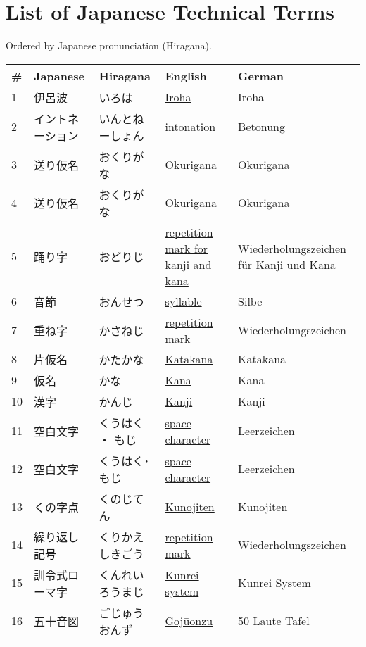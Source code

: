 \chapter{List of Japanese Technical Terms}
\label{chap:ListOfJapaneseTechnicalTerms}
\label{sec:JapaneseTechnicalTerms}
\normalsize Ordered by Japanese pronunciation (Hiragana).
\footnotesize\Padding
\begin{longtable}[c]{p{.5cm}p{3.5cm}p{4cm}p{3.5cm}p{3.5cm}}
\textbf{\#}&\textbf{Japanese}&\textbf{Hiragana}&\textbf{English}&\textbf{German}\\ \hline
1&伊呂波&いろは&\hyperref[sec:Iroha]{Iroha}&Iroha\\
2&イントネーション&いんとねーしょん&\hyperref[sec:Intonation]{intonation}&Betonung\\
3&送り仮名&おくりがな&\hyperref[sec:Okurigana]{Okurigana}&Okurigana\\
4&送り仮名&おくりがな&\hyperref[sec:Okurigana]{Okurigana}&Okurigana\\
5&踊り字&おどりじ&\hyperref[sec:RepitionMarkForKanjiAndKana]{repetition mark for kanji and kana}&Wiederholungszeichen für Kanji und Kana\\
6&音節&おんせつ&\hyperref[sec:Syllable]{syllable}&Silbe\\
7&重ね字&かさねじ&\hyperref[sec:RepitionMark]{repetition mark}&Wiederholungszeichen\\
8&片仮名&かたかな&\hyperref[sec:Katakana]{Katakana}&Katakana\\
9&仮名&かな&\hyperref[sec:Kana]{Kana}&Kana\\
10&漢字&かんじ&\hyperref[sec:Kanji]{Kanji}&Kanji\\
11&空白文字&くうはく ・ もじ&\hyperref[sec:SpaceCharacter]{space character}&Leerzeichen\\
12&空白文字&くうはく･もじ&\hyperref[sec:SpaceCharacter]{space character}&Leerzeichen\\
13&くの字点&くのじてん&\hyperref[sec:Kunojiten]{Kunojiten}&Kunojiten\\
14&繰り返し記号&くりかえしきごう&\hyperref[sec:RepitionMark]{repetition mark}&Wiederholungszeichen\\
15&訓令式ローマ字&くんれいろうまじ&\hyperref[sec:KunreiSystem]{Kunrei system}&Kunrei System\\
16&五十音図&ごじゅうおんず&\hyperref[sec:Gojuonzu]{Gojūonzu}&50 Laute Tafel\\

\end{longtable}
